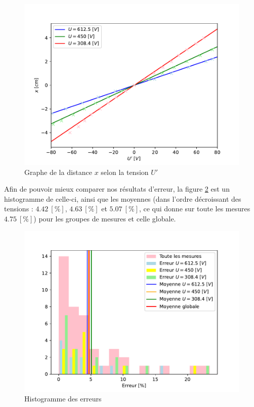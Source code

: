 \documentclass[11pt]{article}
\begin{document}
\begin{figure}[H]
\center
\includegraphics[scale=0.75]{Images/sim-real.pdf}
\caption{Graphe de la distance $x$ selon la tension $U'$}
\label{fig:dist-u}
\end{figure}

Afin de pouvoir mieux comparer nos résultats d'erreur, la figure \ref{fig:hist-err} est un histogramme de celle-ci, ainsi que les moyennes (dans l'ordre décroissant des tensions : $4.42 \ [\%]$, $4.63 \ [\%]$ et $5.07 \ [\%]$, ce qui donne sur toute les mesures $4.75 \ [\%]$) pour les groupes de mesures et celle globale.

\begin{figure}[H]
\center
\includegraphics[scale=0.75]{Images/erreur-hist.pdf}
\caption{Histogramme des erreurs}
\label{fig:hist-err}
\end{figure}
\end{document}
